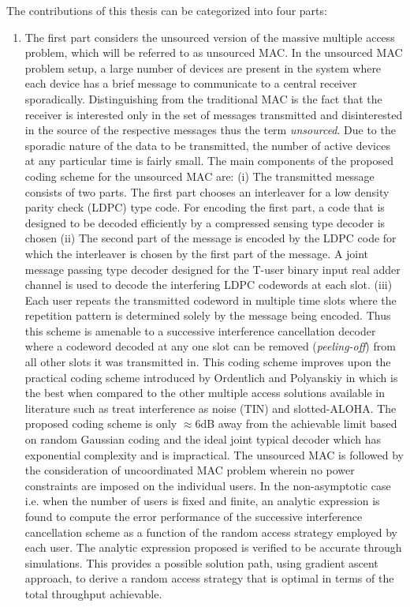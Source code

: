 The contributions of this thesis can be categorized into four parts:
\begin{enumerate}
\item The first part considers the unsourced version of the massive multiple access problem, which will be referred to as unsourced MAC. In the unsourced MAC problem setup, a large number of devices are present in the system where each device has a brief message to communicate to a central receiver sporadically. Distinguishing from the traditional MAC is the fact that the receiver is interested only in the set of messages transmitted and disinterested in the source of the respective messages thus the term \textit{unsourced}. Due to the sporadic nature of the data to be transmitted, the number of active devices at any particular time is fairly small. The main components of the proposed coding scheme for the unsourced MAC are: (i) The transmitted message consists of two parts. The first part chooses an interleaver for a low density parity check (LDPC) type code. For encoding the first part, a code that is designed to be decoded efficiently by a compressed sensing type decoder is chosen (ii) The second part of the message is encoded by the LDPC code for which the interleaver is chosen by the first part of the message. A joint message passing type decoder designed for the T-user binary input real adder channel is used to decode the interfering LDPC codewords at each slot. (iii) Each user repeats the transmitted codeword in multiple time slots where the repetition pattern is determined solely by the message being encoded. Thus this scheme is amenable to a successive interference cancellation decoder where a codeword decoded at any one slot can be removed  (\textit{peeling-off}) from all other slots it was transmitted in. This coding scheme improves upon the practical coding scheme introduced by Ordentlich and Polyanskiy in \cite{ordentlich2017low} which is the best when compared to the other multiple access solutions available in literature such as treat interference as noise (TIN) and slotted-ALOHA. The proposed coding scheme is only $\approx 6$dB away from the achievable limit based on random Gaussian coding and the ideal joint typical decoder which has exponential complexity and is impractical.
The unsourced MAC is followed by the consideration of uncoordinated MAC problem wherein no power constraints are imposed on the individual users. In the non-asymptotic case i.e. when the number of users is fixed and finite, an analytic expression is found to compute the error performance of the successive interference cancellation scheme as a function of the random access strategy employed by each user. The analytic expression proposed is verified to be accurate through simulations. This provides a possible solution path, using gradient ascent approach, to derive a random access strategy that is optimal in terms of the total throughput achievable.


\end{enumerate}

